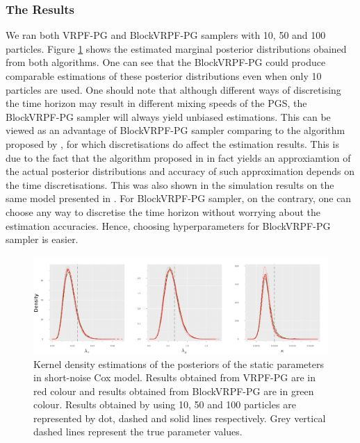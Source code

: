 \documentclass[12pt,a4paper]{article}
\begin{document}
\subsubsection{The Results}
We ran both VRPF-PG and BlockVRPF-PG samplers with 10, 50 and 100 particles. Figure \ref{Figure:SNC_Sim_Posterior} shows the estimated marginal posterior distributions obained from both algorithms. One can see that the BlockVRPF-PG could produce comparable estimations of these posterior distributions even when only 10 particles are used. One should note that although different ways of discretising the time horizon may result in different mixing speeds of the PGS, the BlockVRPF-PG sampler will always yield unbiased estimations. This can be viewed as an advantage of BlockVRPF-PG sampler comparing to the algorithm proposed by \cite{finke2014static}, for which discretisations do affect the estimation results. This is due to the fact that the algorithm proposed in \cite{finke2014static} in fact yields an approxiamtion of the actual posterior distributions and accuracy of such approximation depends on the time discretisations. This was also shown in the simulation results on the same model presented in \cite{finke2014static}. For BlockVRPF-PG sampler, on the contrary, one can choose any way to discretise the time horizon without worrying about the estimation accuracies. Hence, choosing hyperparameters for BlockVRPF-PG sampler is easier. 
\begin{figure}[htb!]
    \centering
    \includegraphics[width=\textwidth]{SNC_Sim_posterior.pdf}
    \caption{Kernel density estimations of the posteriors of the static parameters in short-noise Cox model. Results obtained from VRPF-PG are in red colour and results obtained from BlockVRPF-PG are in green colour. Results obtained by using 10, 50 and 100 particles are represented by dot, dashed and solid lines respectively. Grey vertical dashed lines represent the true parameter values.}
    \label{Figure:SNC_Sim_Posterior}
\end{figure}
\end{document}
